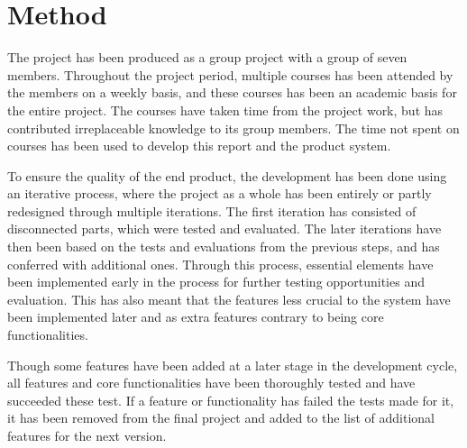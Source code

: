 \section{Method}
The project has been produced as a group project with a group of seven members. Throughout the project period, multiple courses has been attended by the members on a weekly basis, and these courses has been an academic basis for the entire project. The courses have taken time from the project work, but has contributed irreplaceable knowledge to its group members. The time not spent on courses has been used to develop this report and the product system.
\par
To ensure the quality of the end product, the development has been done using an iterative process, where the project as a whole has been entirely or partly redesigned through multiple iterations. The first iteration has consisted of disconnected parts, which were tested and evaluated. The later iterations have then been based on the tests and evaluations from the previous steps, and has conferred with additional ones. Through this process, essential elements have been implemented early in the process for further testing opportunities and evaluation. This has also meant that the features less crucial to the system have been implemented later and as extra features contrary to being core functionalities.
\par
Though some features have been added at a later stage in the development cycle, all features and core functionalities have been thoroughly tested and have succeeded these test. If a feature or functionality has failed the tests made for it, it has been removed from the final project and added to the list of additional features for the next version.